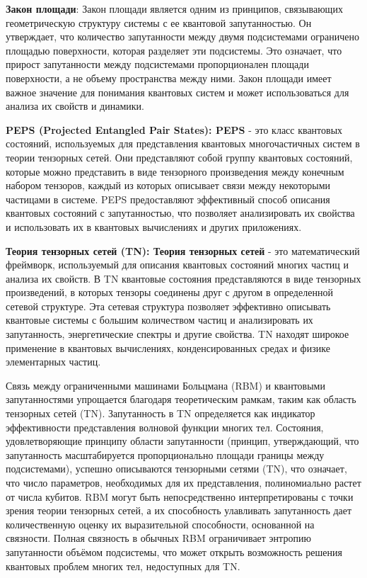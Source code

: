 \textbf{Закон площади}: Закон площади является одним из принципов, связывающих геометрическую структуру системы с ее квантовой запутанностью. Он утверждает, что количество запутанности между двумя подсистемами ограничено площадью поверхности, которая разделяет эти подсистемы. Это означает, что прирост запутанности между подсистемами пропорционален площади поверхности, а не объему пространства между ними. Закон площади имеет важное значение для понимания квантовых систем и может использоваться для анализа их свойств и динамики.
\vspace{0,25cm}

\textbf{PEPS (Projected Entangled Pair States): PEPS} - это класс квантовых состояний, используемых для представления квантовых многочастичных систем в теории тензорных сетей. Они представляют собой группу квантовых состояний, которые можно представить в виде тензорного произведения между конечным набором тензоров, каждый из которых описывает связи между некоторыми частицами в системе. PEPS предоставляют эффективный способ описания квантовых состояний с запутанностью, что позволяет анализировать их свойства и использовать их в квантовых вычислениях и других приложениях.
\vspace{0,25cm}

\textbf{Теория тензорных сетей (TN): Теория тензорных сетей} - это математический фреймворк, используемый для описания квантовых состояний многих частиц и анализа их свойств. В TN квантовые состояния представляются в виде тензорных произведений, в которых тензоры соединены друг с другом в определенной сетевой структуре. Эта сетевая структура позволяет эффективно описывать квантовые системы с большим количеством частиц и анализировать их запутанность, энергетические спектры и другие свойства. TN находят широкое применение в квантовых вычислениях, конденсированных средах и физике элементарных частиц.
\vspace{0,25cm}


Связь между ограниченными машинами Больцмана (RBM) и квантовыми запутанностями упрощается благодаря теоретическим рамкам, таким как область тензорных сетей (TN). Запутанность в TN определяется как индикатор эффективности представления волновой функции многих тел. Состояния, удовлетворяющие принципу области запутанности (принцип, утверждающий, что запутанность масштабируется пропорционально площади границы между подсистемами), успешно описываются тензорными сетями (TN), что означает, что число параметров, необходимых для их представления, полиномиально растет от числа кубитов. RBM могут быть непосредственно интерпретированы с точки зрения теории тензорных сетей, а их способность улавливать запутанность дает количественную оценку их выразительной способности, основанной на связности. Полная связность в обычных RBM ограничивает энтропию запутанности объёмом подсистемы, что может открыть возможность решения квантовых проблем многих тел, недоступных для TN.
\vspace{0,25cm}

